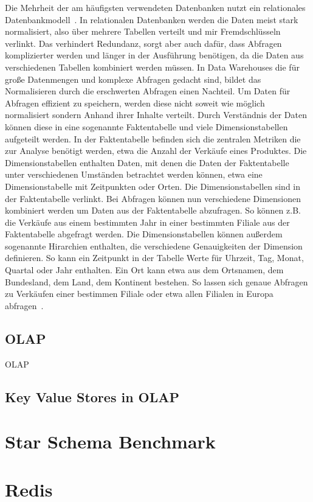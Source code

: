 Die Mehrheit der am häufigsten verwendeten Datenbanken nutzt ein relationales Datenbankmodell~\cite{db-engines_most_2023}. 
In relationalen Datenbanken werden die Daten meist stark normalisiert, also über mehrere Tabellen verteilt und mir Fremdschlüsseln verlinkt. 
Das verhindert Redundanz, sorgt aber auch dafür, dass Abfragen komplizierter werden und länger in der Ausführung benötigen, da die Daten aus verschiedenen Tabellen kombiniert werden müssen.
In Data Warehouses die für große Datenmengen und komplexe Abfragen gedacht sind, bildet das Normalisieren durch die erschwerten Abfragen einen Nachteil.
Um Daten für Abfragen effizient zu speichern, werden diese nicht soweit wie möglich normalisiert sondern Anhand ihrer Inhalte verteilt. Durch Verständnis der Daten können diese in eine sogenannte Faktentabelle und viele Dimensionstabellen aufgeteilt werden. In der Faktentabelle befinden sich die zentralen Metriken die zur Analyse benötigt werden, etwa die Anzahl der Verkäufe eines Produktes. Die Dimensionstabellen enthalten Daten, mit denen die Daten der Faktentabelle unter verschiedenen Umständen betrachtet werden können, etwa eine Dimensionstabelle mit Zeitpunkten oder Orten. Die Dimensionstabellen sind in der Faktentabelle verlinkt. Bei Abfragen können nun verschiedene Dimensionen kombiniert werden um Daten aus der Faktentabelle abzufragen. So können z.B. die Verkäufe aus einem bestimmten Jahr in einer bestimmten Filiale aus der Faktentabelle abgefragt werden.
Die Dimensionstabellen können außerdem sogenannte Hirarchien enthalten, die verschiedene Genauigkeiten der Dimension definieren.
So kann ein Zeitpunkt in der Tabelle Werte für Uhrzeit, Tag, Monat, Quartal oder Jahr enthalten. Ein Ort kann etwa aus dem Ortsnamen, dem Bundesland, dem Land, dem Kontinent bestehen. So lassen sich genaue Abfragen zu Verkäufen einer bestimmen Filiale oder etwa allen Filialen in Europa abfragen~\cite[s. 5]{vaisman_data_2022}.


\subsection{\acf{OLAP}}
\acf{OLAP}

















\subsection{Key Value Stores in OLAP}
\section{Star Schema Benchmark}
\section{Redis}